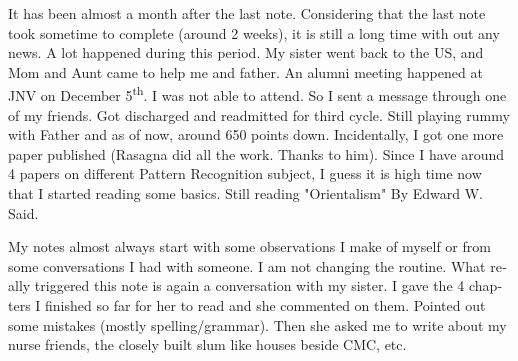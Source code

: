 \vskip 2pt
\begin{english}
\date{Monday December 13 2010}

It has been almost a month after the last note. Considering that the last note took sometime to complete (around 2 weeks), it is still a long time with out any news. A lot happened during this period. My sister went back to the US, and Mom and Aunt came to help me and father. An alumni meeting happened at JNV on December 5\textsuperscript{th}. I was not able to attend. So I sent a message through one of my friends. Got discharged and readmitted for third cycle. Still playing rummy with Father and as of now, around 650 points down. Incidentally, I got one more paper published (Rasagna did all the work. Thanks to him). Since I have around 4 papers on different Pattern Recognition subject, I guess it is high time now that I started reading some basics. Still reading "Orientalism" By Edward W. Said. 

My notes almost always start with some observations I make of myself or from some conversations I had with someone. I am not changing the routine. What really triggered this note is again a conversation with my sister. I gave the 4 chapters I finished so far for her to read and she commented on them. Pointed out some mistakes (mostly spelling/grammar). Then she asked me to write about my nurse friends, the closely built slum like houses beside CMC, etc.
\end{english}
\newpage
